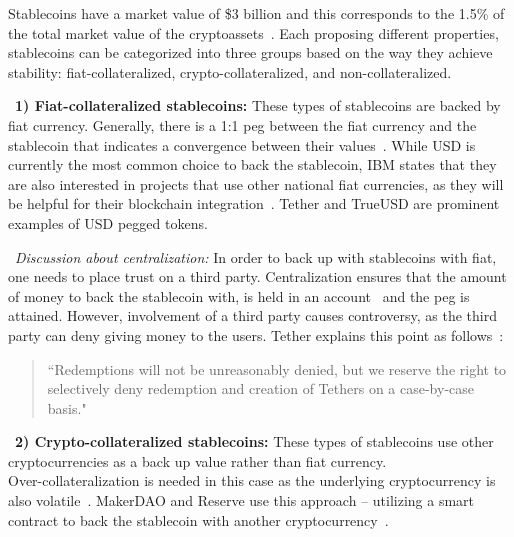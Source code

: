 Stablecoins have a market value of \$3 billion and this corresponds to the 1.5\% of the total market value of the cryptoassets~\cite{report}. Each proposing different properties, stablecoins can be categorized into three groups based on the way they achieve stability: fiat-collateralized, crypto-collateralized, and non-collateralized.

~\textbf{1) Fiat-collateralized stablecoins:} These types of stablecoins are backed by fiat currency. Generally, there is a 1:1 peg between the fiat currency and the stablecoin that indicates a convergence between their values~\cite{linkedin}. While USD is currently the most common choice to back the stablecoin, IBM states that they are also interested in projects that use other national fiat currencies, as they will be helpful for their blockchain integration~\cite{cointelegraph}. Tether and TrueUSD are prominent examples of USD pegged tokens.

~\textit{Discussion about centralization:} In order to back up with stablecoins with fiat, one needs to place trust on a third party. Centralization ensures that the amount of money to back the stablecoin with, is held in an account~\cite{techrev} and the peg is attained. However, involvement of a third party causes controversy, as the third party can deny giving money to the users. Tether explains this point as follows~\cite{cryptoinsider}:

\begin{quote}
``Redemptions will not be unreasonably denied, but we reserve the right to selectively deny redemption and creation of Tethers on a case-by-case basis."
\end{quote}


~\textbf{2) Crypto-collateralized stablecoins:} These types of stablecoins use other cryptocurrencies as a back up value rather than fiat currency. \\ Over-collateralization is needed in this case as the underlying cryptocurrency is also volatile~\cite{linkedin}. MakerDAO and Reserve use this approach -- utilizing a smart contract to back the stablecoin with another cryptocurrency~\cite{cointelegraph}.

